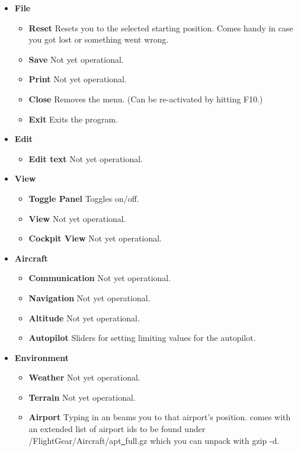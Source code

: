 \begin{itemize}
 \item \textbf{File}
 \begin{itemize}
 \item \textbf{Reset} Resets you to the selected starting position. Comes handy in case you got
lost or something went wrong.
 \item \textbf{Save} Not yet operational.
 \item \textbf{Print} Not yet operational.
 \item \textbf{Close} Removes the menu. (Can be re-activated by hitting F10.)
 \item \textbf{Exit} Exits the program.
\end{itemize}

 \item \textbf{Edit}
 \begin{itemize}
 \item \textbf{Edit text} Not yet operational.
 \end{itemize}

 \item \textbf{View}
 \begin{itemize}
 \item \textbf{Toggle Panel} Toggles  on/off.
 \item \textbf{View} Not yet operational.
 \item \textbf{Cockpit View} Not yet operational.
 \end{itemize}

 \item \textbf{Aircraft}
 \begin{itemize}
 \item \textbf{Communication} Not yet operational.
 \item \textbf{Navigation} Not yet operational.
 \item \textbf{Altitude} Not yet operational.
 \item \textbf{Autopilot} Sliders for setting limiting values for the autopilot.
 \end{itemize}

 \item \textbf{Environment}
 \begin{itemize}
 \item \textbf{Weather} Not yet operational.
 \item \textbf{Terrain} Not yet operational.
 \item \textbf{Airport} Typing in an  beams you to that airport's position.
 \FlightGear comes with an extended list of airport ids to be found under
 /FlightGear/Aircraft/apt\underline{~}full.gz which you can unpack with gzip -d.
 \end{itemize}


\end{itemize}
